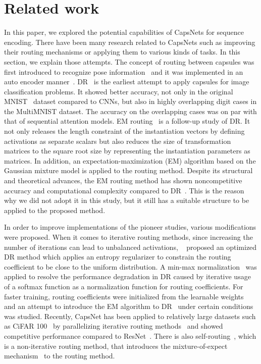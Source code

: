 \documentclass[review]{elsarticle}
\begin{document}
\section{Related work}
In this paper, we explored the potential capabilities of CapsNets for sequence encoding.
There have been many research related to CapsNets such as improving their routing mechanisms or applying them to various kinds of tasks.
In this section, we explain those attempts.
The concept of routing between capsules was first introduced to recognize pose information~\citep{DBLP:conf/icann/HintonKW11} and it was implemented in an auto encoder manner~\citep{DBLP:conf/nips/HintonZ93}.
DR~\citep{DBLP:conf/nips/SabourFH17} is the earliest attempt to apply capsules for image classification problems. It showed better accuracy, not only in the original MNIST~\citep{lecun-mnisthandwrittendigit-2010} dataset compared to CNNs, but also in highly overlapping digit cases in the MultiMNIST dataset.
The accuracy on the overlapping cases was on par with that of sequential attention models.
EM routing~\citep{DBLP:conf/iclr/HintonSF18} is a follow-up study of DR.
It not only releases the length constraint of the instantiation vectors by defining activations as separate scalars but also reduces the size of transformation matrices to the square root size by representing the instantiation parameters as matrices.
In addition, an expectation-maximization (EM) algorithm based on the Gaussian mixture model is applied to the routing method.
Despite its structural and theoretical advances, the EM routing method has shown noncompetitive accuracy and computational complexity compared to DR~\citep{Malmgren1314210, DBLP:conf/nips/HahnPK19}.
This is the reason why we did not adopt it in this study, but it still has a suitable structure to be applied to the proposed method.

In order to improve implementations of the pioneer studies, various modifications were proposed.
When it comes to iterative routing methods, since increasing the number of iterations can lead to unbalanced activations, ~\citep{DBLP:conf/iclr/Wang018} proposed an optimized DR method which applies an entropy regularizer to constrain the routing coefficient to be close to the uniform distribution.
A min-max normalization~\citep{DBLP:journals/corr/abs-1903-09662} was applied to resolve the performance degradation in DR caused by iterative usage of a softmax function as a normalization function for routing coefficients. 
For faster training, routing coefficients were initialized from the learnable weights~\citep{DBLP:conf/eccv/RamasingheAK18} and an attempt to introduce the EM algorithm to DR~\citep{DBLP:series/sci/Zhang0W19} under certain conditions was studied.
Recently, CapsNet has been applied to relatively large datasets such as CiFAR 100~\citep{Krizhevsky09learningmultiple} by parallelizing iterative routing methods~\citep{DBLP:conf/iclr/TsaiSGS20} and showed competitive performance compared to ResNet~\citep{DBLP:conf/cvpr/HeZRS16}.
There is also self-routing~\citep{DBLP:conf/nips/HahnPK19}, which is a non-iterative routing method, that introduces the mixture-of-expect mechanism~\citep{DBLP:journals/neco/JacobsJNH91} to the routing method.
\end{document}
